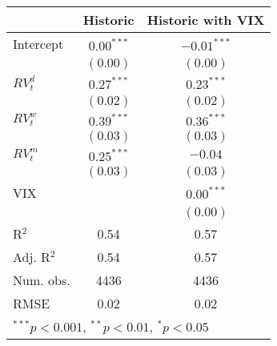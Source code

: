 
\begin{tabular}{l c c }
\hline
 & Historic & Historic with VIX \\
\hline
Intercept    & $0.00^{***}$ & $-0.01^{***}$ \\
             & $(0.00)$     & $(0.00)$      \\
$RV_{t}^{d}$ & $0.27^{***}$ & $0.23^{***}$  \\
             & $(0.02)$     & $(0.02)$      \\
$RV_{t}^{w}$ & $0.39^{***}$ & $0.36^{***}$  \\
             & $(0.03)$     & $(0.03)$      \\
$RV_{t}^{m}$ & $0.25^{***}$ & $-0.04$       \\
             & $(0.03)$     & $(0.03)$      \\
VIX          &              & $0.00^{***}$  \\
             &              & $(0.00)$      \\
\hline
R$^2$        & 0.54         & 0.57          \\
Adj. R$^2$   & 0.54         & 0.57          \\
Num. obs.    & 4436         & 4436          \\
RMSE         & 0.02         & 0.02          \\
\hline
\multicolumn{3}{l}{\scriptsize{$^{***}p<0.001$, $^{**}p<0.01$, $^*p<0.05$}}
\end{tabular}
